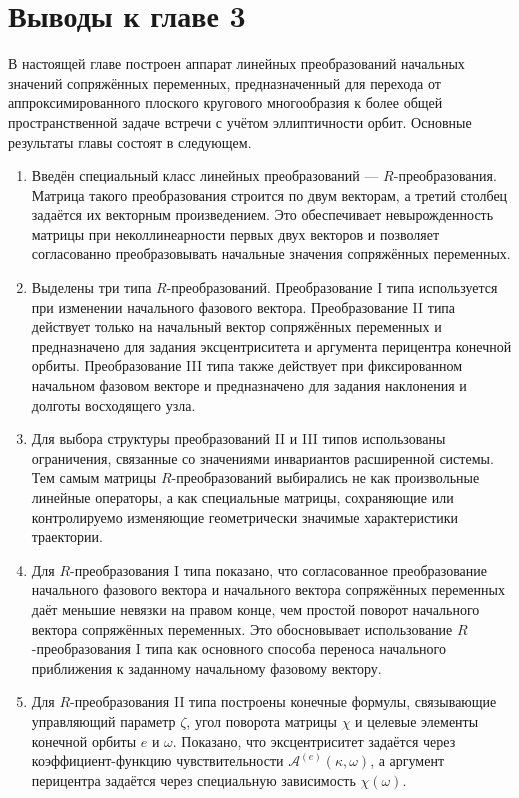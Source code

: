 \section{Выводы к главе 3}

В настоящей главе построен аппарат линейных преобразований начальных значений сопряжённых переменных, предназначенный для перехода от аппроксимированного плоского кругового многообразия к более общей пространственной задаче встречи с учётом эллиптичности орбит. Основные результаты главы состоят в следующем.

\begin{enumerate}
	\item Введён специальный класс линейных преобразований --- \(R\)-преобразования. Матрица такого преобразования строится по двум векторам, а третий столбец задаётся их векторным произведением. Это обеспечивает невырожденность матрицы при неколлинеарности первых двух векторов и позволяет согласованно преобразовывать начальные значения сопряжённых переменных.
	
	\item Выделены три типа \(R\)-преобразований. Преобразование I типа используется при изменении начального фазового вектора. Преобразование II типа действует только на начальный вектор сопряжённых переменных и предназначено для задания эксцентриситета и аргумента перицентра конечной орбиты. Преобразование III типа также действует при фиксированном начальном фазовом векторе и предназначено для задания наклонения и долготы восходящего узла.
	
	\item Для выбора структуры преобразований II и III типов использованы ограничения, связанные со значениями инвариантов расширенной системы. Тем самым матрицы \(R\)-преобразований выбирались не как произвольные линейные операторы, а как специальные матрицы, сохраняющие или контролируемо изменяющие геометрически значимые характеристики траектории.
	
	\item Для \(R\)-преобразования I типа показано, что согласованное преобразование начального фазового вектора и начального вектора сопряжённых переменных даёт меньшие невязки на правом конце, чем простой поворот начального вектора сопряжённых переменных. Это обосновывает использование \(R\)-преобразования I типа как основного способа переноса начального приближения к заданному начальному фазовому вектору.
	
	\item Для \(R\)-преобразования II типа построены конечные формулы, связывающие управляющий параметр \(\zeta\), угол поворота матрицы \(\chi\) и целевые элементы конечной орбиты \(e\) и \(\omega\). Показано, что эксцентриситет задаётся через коэффициент-функцию чувствительности \(\mathcal A^{(e)}(\kappa,\omega)\), а аргумент перицентра задаётся через специальную зависимость \(\chi(\omega)\).
	

\end{enumerate}
